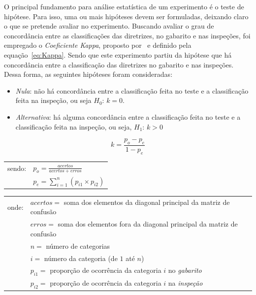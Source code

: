 O principal fundamento para análise  estatística de um experimento é o
teste  de  hipótese.  Para  isso,  uma  ou  mais hipóteses  devem  ser
formuladas, deixando  claro o que se pretende  avaliar no experimento.
Buscando avaliar  o grau de  concordância entre as  classificações das
diretrizes,  no  gabarito  e  nas  inspeções,  foi  empregado  o  {\em
  Coeficiente Kappa},  proposto por~ e definido
pela  equação~\ref{eq:Kappa}.  Sendo  que este  experimento  partiu da
hipótese que  há concordância entre a classificação  das diretrizes no
gabarito e  nas inspeções.  Dessa forma, as  seguintes hipóteses foram
consideradas:

\begin{itemize}

  \item {\em Nula}: não há concordância entre a classificação feita no
    teste e a classificação feita na inspeção, ou seja $H_0$: $k = 0$.

  \item   {\em   Alternativa}:   há   alguma  concordância   entre   a
    classificação feita no teste  e a classificação feita na inspeção,
    ou seja, $H_1$: $k > 0$

\end{itemize}

\begin{equation}
  k = \frac{p_{o} - p_{e}}{1 - p_{e}}
  \label{eq:Kappa}
\end{equation}

\begin{tabular}{cl}
  sendo: & 
  $p_{o} = \frac{acertos}
  {acertos + erros}$ \\
  & $p_{e} = \displaystyle\sum_{i=1}^{n}(p_{i1} \times p_{i2})$
\end{tabular}

\begin{tabular}{ll}
  onde: 

  & $acertos=$ soma  dos elementos da diagonal principal  da matriz de
  confusão\\

  & $erros=$ soma  dos elementos fora da diagonal  principal da matriz
  de confusão\\

  & $n =$ número de categorias\\
  & $i =$ número da categoria (de $1$ até $n$)\\

  &  $p_{i1} =$  proporção  de  ocorrência da  categoria  $i$ no  {\em
    gabarito}\\

  &  $p_{i2} =$  proporção  de  ocorrência da  categoria  $i$ na  {\em
    inspeção}

\end{tabular}

